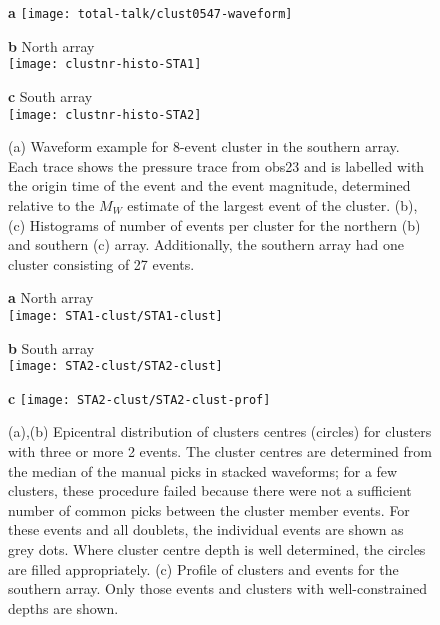 \documentclass[reviewcopy]{elsart}
\renewcommand{\includegraphics}[2][]{\fbox{#2}}
\begin{document}
\begin{figure}
{\sf \bf a}
\texttt{[image: total-talk/clust0547-waveform]}\\[1cm]

\parbox{0.5\textwidth}{{\sf \bf b} North array \\
\texttt{[image: clustnr-histo-STA1]}}
\parbox{0.5\textwidth}{{\sf \bf c} South array \\
\texttt{[image: clustnr-histo-STA2]}}


\caption{(a) Waveform example for 8-event cluster in the southern
  array.  Each trace shows the pressure trace from obs23 and is labelled with the origin time of the event and
  the event magnitude, determined relative to the $M_W$ estimate of
  the largest event of the
cluster. (b), (c) Histograms of number of events per cluster for the northern
(b) and southern (c) array. Additionally, the southern array had one
cluster consisting of 27 events.}
\label{fig:clust-waveform-histo}
\end{figure}

\begin{figure}
\parbox{0.5\textwidth}{{\sf \bf a} North array \\
\texttt{[image: STA1-clust/STA1-clust]}}
\parbox{0.5\textwidth}{{\sf \bf b} South array \\
\texttt{[image: STA2-clust/STA2-clust]}}
{\sf \bf c}
\texttt{[image: STA2-clust/STA2-clust-prof]}

\caption{(a),(b) Epicentral distribution of clusters centres
  (circles) for clusters with three or more 2 events. The cluster centres
  are determined from the median of the manual picks in stacked
  waveforms; for a few clusters, these procedure failed because there
  were not a sufficient number of common picks between the cluster
  member events.   For these events and all doublets, the
  individual events are shown as grey dots.  Where cluster centre
  depth is well determined, the circles are filled appropriately.
 (c) Profile of clusters and events for the southern array. Only those events and
 clusters with well-constrained depths are shown.}
\label{fig:clust-location}
\end{figure}
\end{document}
